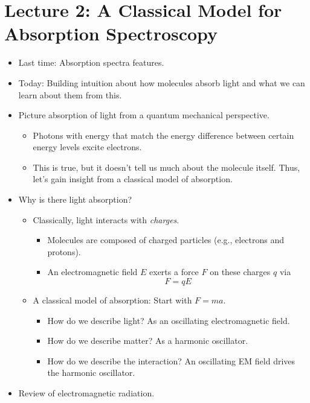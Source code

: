\documentclass[../notes.tex]{subfiles}
\begin{document}
\section{Lecture 2: A Classical Model for Absorption Spectroscopy}
\begin{itemize}
    \item {}Last time: Absorption spectra features.
    \item Today: Building intuition about how molecules absorb light and what we can learn about them from this.
    \item Picture absorption of light from a quantum mechanical perspective.
    \begin{itemize}
        \item Photons with energy that match the energy difference between certain energy levels excite electrons.
        \item This is true, but it doesn't tell us much about the molecule itself. Thus, let's gain insight from a classical model of absorption.
    \end{itemize}
    \item Why is there light absorption?
    \begin{itemize}
        \item Classically, light interacts with \emph{charges}.
        \begin{itemize}
            \item Molecules are composed of charged particles (e.g., electrons and protons).
            \item An electromagnetic field $E$ exerts a force $F$ on these charges $q$ via
            \begin{equation*}
                F = qE
            \end{equation*}
        \end{itemize}
        \item A classical model of absorption: Start with $F=ma$.
        \begin{itemize}
            \item How do we describe light? As an oscillating electromagnetic field.
            \item How do we describe matter? As a harmonic oscillator.
            \item How do we describe the interaction? An oscillating EM field drives the harmonic oscillator.
        \end{itemize}
    \end{itemize}
    \item Review of electromagnetic radiation.

\end{itemize}
\end{document}
